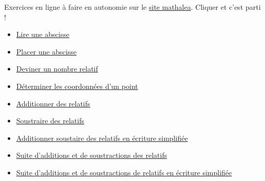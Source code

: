 \begin{mathalea}[][\mathaleaLogo]
    Exercices en ligne à faire en autonomie sur le \href{https://coopmaths.fr/mathalea.html}{site mathalea}. 
    Cliquer et c'est parti !
    \begin{itemize}
        \item \href{https://coopmaths.fr/mathalea.html?ex=5R11,s=1,n=3,i=1&v=ex}{Lire une abscisse}
        \item \href{https://coopmaths.fr/mathalea.html?ex=5R11-2,s=1,n=3,i=1&v=ex}{Placer une abscisse}
        \item \href{https://coopmaths.fr/mathalea.html?ex=5R10-1,n=3&v=ex}{Deviner un nombre relatif}        
        \item \href{https://coopmaths.fr/mathalea.html?ex=5R12-2,s=1,s2=true&v=ex}{Déterminer les coordonnées d'un point}
        \item \href{https://coopmaths.fr/mathalea.html?ex=5R20,s=20,s2=false,s3=false,n=5,i=1&v=ex}{Additionner des relatifs}
        \item \href{https://coopmaths.fr/mathalea.html?ex=5R21,s=20,s2=false,n=5,cd=1,i=1&v=ex}{Soustraire des relatifs}
        \item \href{https://coopmaths.fr/mathalea.html?ex=5R20,s=20,s2=true,s3=false,n=5,i=1&v=ex}{Additionner soustaire des relatifs en écriture simplifiée}
        \item \href{https://coopmaths.fr/mathalea.html?ex=5R22,s=20,s2=false,n=3,i=1&v=ex}{Suite d'additions et de soustractions des relatifs}
        \item \href{https://coopmaths.fr/mathalea.html?ex=5R22,s=20,s2=true,n=3,i=1&v=ex}{Suite d'additions et de soustractions de relatifs en écriture simplifiée}
    \end{itemize}
\end{mathalea}
